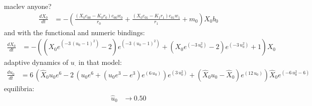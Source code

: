 \documentclass{article}
\begin{document}
maclev anyone? 
\[\begin{align*}
\frac{dX_{0}}{dt} &= -{\left(\frac{{\left(X_{0} c_{00} - K_{0} r_{0}\right)} c_{00} w_{0}}{r_{0}} + \frac{{\left(X_{0} c_{01} - K_{1} r_{1}\right)} c_{01} w_{1}}{r_{1}} + m_{0}\right)} X_{0} b_{0}
\end{align*}\]
and with the functional and numeric bindings: 
\[\begin{align*}
\frac{dX_{0}}{dt} &= -{\left({\left(X_{0} e^{\left(-3 \, {\left(u_{0} - 1\right)}^{2}\right)} - 2\right)} e^{\left(-3 \, {\left(u_{0} - 1\right)}^{2}\right)} + {\left(X_{0} e^{\left(-3 \, u_{0}^{2}\right)} - 2\right)} e^{\left(-3 \, u_{0}^{2}\right)} + 1\right)} X_{0}
\end{align*}\]
adaptive dynamics of $u_\cdot$ in that model:
\[\begin{align*}
\frac{du_{0}}{dt} &= 6 \, {\left(\hat{X}_{0} u_{0} e^{6} - 2 \, {\left(u_{0} e^{6} + {\left(u_{0} e^{3} - e^{3}\right)} e^{\left(6 \, u_{0}\right)}\right)} e^{\left(3 \, u_{0}^{2}\right)} + {\left(\hat{X}_{0} u_{0} - \hat{X}_{0}\right)} e^{\left(12 \, u_{0}\right)}\right)} \hat{X}_{0} e^{\left(-6 \, u_{0}^{2} - 6\right)}
\end{align*}\]
equilibria:
\[\begin{align*}
  \hat{u}_{0} &\to 0.50
\end{align*}\]
\end{document}
